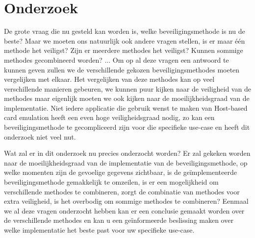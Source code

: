 \section{Onderzoek}
\label{sec:onderzoek}

De grote vraag die nu gesteld kan worden is, welke beveiligingsmethode is nu de beste? Maar we moeten ons natuurlijk ook andere vragen stellen, is er maar één methode het veiligst? Zijn er meerdere methodes het veiligst? Kunnen sommige methodes gecombineerd worden? ... Om op al deze vragen een antwoord te kunnen geven zullen we de verschillende gekozen beveiligingsmethodes moeten vergelijken met elkaar. Het vergelijken van deze methodes kan op veel verschillende manieren gebeuren, we kunnen puur kijken naar de veiligheid van de methodes maar eigenlijk moeten we ook kijken naar de moeilijkheidsgraad van de implementatie. Niet iedere applicatie die gebruik wenst te maken van Host-based card emulation heeft een even hoge veiligheidsgraad nodig, zo kan een beveiligingsmethode te gecompliceerd zijn voor die specifieke use-case en heeft dit onderzoek niet veel nut. 

Wat zal er in dit onderzoek nu precies onderzocht worden? Er zal gekeken worden naar de moeilijkheidsgraad van de implementatie van de beveiligingsmethode, op welke momenten zijn de gevoelige gegevens zichtbaar, is de geïmplementeerde beveiligingsmethode gemakkelijk te omzeilen, is er een mogelijkheid om verschillende methodes te combineren, zorgt de combinatie van methodes voor extra veiligheid, is het overbodig om sommige methodes te combineren? Eenmaal we al deze vragen onderzocht hebben kan er een conclusie gemaakt worden over de verschillende methodes en kan u een geïnformeerde beslissing maken over welke implementatie het beste past voor uw specifieke use-case.